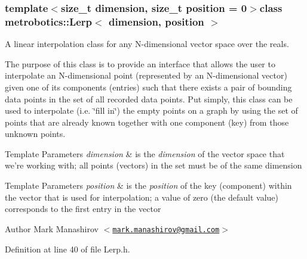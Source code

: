 \subsubsection*{template$<$size\-\_\-t dimension, size\-\_\-t position = 0$>$class metrobotics\-::\-Lerp$<$ dimension, position $>$}

\-A linear interpolation class for any \-N-\/dimensional vector space over the reals. 

\-The purpose of this class is to provide an interface that allows the user to interpolate an \-N-\/dimensional point (represented by an \-N-\/dimensional vector) given one of its components (entries) such that there exists a pair of bounding data points in the set of all recorded data points. \-Put simply, this class can be used to interpolate (i.\-e. \char`\"{}fill in\char`\"{}) the empty points on a graph by using the set of points that are already known together with one component (key) from those unknown points.

\label{classmetrobotics_1_1VectorN_dimension}%
\hypertarget{classmetrobotics_1_1VectorN_dimension}{}%
 
\begin{DoxyTemplParams}{\-Template Parameters}
{\em dimension} & is the {\itshape dimension\/} of the vector space that we're working with; all points (vectors) in the set must be of the same dimension\\
\hline
\end{DoxyTemplParams}
\label{classmetrobotics_1_1Lerp_position}%
\hypertarget{classmetrobotics_1_1Lerp_position}{}%
 
\begin{DoxyTemplParams}{\-Template Parameters}
{\em position} & is the {\itshape position\/} of the key (component) within the vector that is used for interpolation; a value of zero (the default value) corresponds to the first entry in the vector\\
\hline
\end{DoxyTemplParams}
\begin{DoxyAuthor}{\-Author}
\-Mark \-Manashirov $<$\href{mailto:mark.manashirov@gmail.com}{\tt mark.\-manashirov@gmail.\-com}$>$ 
\end{DoxyAuthor}


\-Definition at line 40 of file \-Lerp.\-h.



